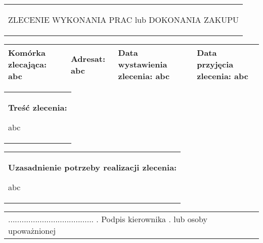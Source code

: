 \documentclass[11pt,a4paper]{article}
\begin{document}
\begin{tabularx}{\linewidth}{X}
\begin{center}
ZLECENIE WYKONANIA PRAC lub DOKONANIA ZAKUPU
\end{center}
\end{tabularx}

\begin{tabularx}{\textwidth}{|X|X|X|X|}
\hline
{\scriptsize \textbf{Komórka zlecająca:}}\newline
\newline
abc \newline
& {\scriptsize \textbf{Adresat:}}\newline
\newline
abc \newline 
& {\scriptsize \textbf{Data wystawienia zlecenia:}}\newline
\newline
abc \newline
& {\scriptsize \textbf{Data przyjęcia zlecenia:}}\newline
\newline
abc \newline
\\ \hline
\end{tabularx}

\begin{tabularx}{\linewidth}{|X|}
{\footnotesize \textbf{Treść zlecenia:}}\newline

abc
\newline
\\
\end{tabularx}


\begin{tabularx}{\linewidth}{|X|}
{\footnotesize \textbf{Uzasadnienie potrzeby realizacji zlecenia:}}\newline

abc
\newline 
\\
\end{tabularx}

\begin{tabularx}{\linewidth}{|X|}

\hspace{14.5cm} {\scriptsize ......................................} \newline .
\hspace{14.5cm} {\scriptsize Podpis kierownika} \newline .
\hspace{14.2cm} {\scriptsize lub osoby upoważnionej}
\end{tabularx}
\end{document}

